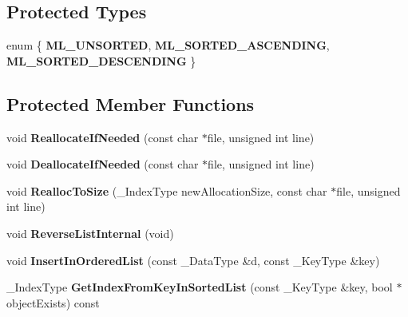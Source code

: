 \subsection*{Protected Types}
\begin{DoxyCompactItemize}
\item 
enum \{ {\bfseries M\-L\-\_\-\-U\-N\-S\-O\-R\-T\-E\-D}, 
{\bfseries M\-L\-\_\-\-S\-O\-R\-T\-E\-D\-\_\-\-A\-S\-C\-E\-N\-D\-I\-N\-G}, 
{\bfseries M\-L\-\_\-\-S\-O\-R\-T\-E\-D\-\_\-\-D\-E\-S\-C\-E\-N\-D\-I\-N\-G}
 \}
\end{DoxyCompactItemize}
\subsection*{Protected Member Functions}
\begin{DoxyCompactItemize}
\item 
\hypertarget{class_data_structures_1_1_multilist_ae51593f68d24493bce8497ef146254ec}{void {\bfseries Reallocate\-If\-Needed} (const char $\ast$file, unsigned int line)}\label{class_data_structures_1_1_multilist_ae51593f68d24493bce8497ef146254ec}

\item 
\hypertarget{class_data_structures_1_1_multilist_ae6d422cd5abd6d957aa9f6ca4ef2b96b}{void {\bfseries Deallocate\-If\-Needed} (const char $\ast$file, unsigned int line)}\label{class_data_structures_1_1_multilist_ae6d422cd5abd6d957aa9f6ca4ef2b96b}

\item 
\hypertarget{class_data_structures_1_1_multilist_ad40d1b2609ef5ff466e335b9910b1f74}{void {\bfseries Realloc\-To\-Size} (\-\_\-\-Index\-Type new\-Allocation\-Size, const char $\ast$file, unsigned int line)}\label{class_data_structures_1_1_multilist_ad40d1b2609ef5ff466e335b9910b1f74}

\item 
\hypertarget{class_data_structures_1_1_multilist_a4c65d0fb8699c772e27ab7b41d1d7528}{void {\bfseries Reverse\-List\-Internal} (void)}\label{class_data_structures_1_1_multilist_a4c65d0fb8699c772e27ab7b41d1d7528}

\item 
\hypertarget{class_data_structures_1_1_multilist_a19491f8d38d094d0f42d7cbc80d76c2c}{void {\bfseries Insert\-In\-Ordered\-List} (const \-\_\-\-Data\-Type \&d, const \-\_\-\-Key\-Type \&key)}\label{class_data_structures_1_1_multilist_a19491f8d38d094d0f42d7cbc80d76c2c}

\item 
\hypertarget{class_data_structures_1_1_multilist_a8ecfd97a885f59dc8c0c1115ae54503b}{\-\_\-\-Index\-Type {\bfseries Get\-Index\-From\-Key\-In\-Sorted\-List} (const \-\_\-\-Key\-Type \&key, bool $\ast$object\-Exists) const }\label{class_data_structures_1_1_multilist_a8ecfd97a885f59dc8c0c1115ae54503b}


\end{DoxyCompactItemize}
